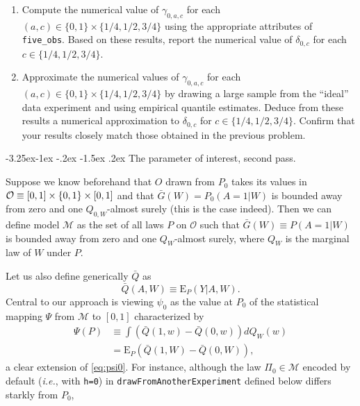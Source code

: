 \documentclass[]{article}
\makeatletter
\renewcommand\subsection{\@startsection{subsection}{3}{\z@}%
                                     {-3.25ex\@plus -1ex \@minus -.2ex}%
                                     {-1.5ex \@plus .2ex}%
                                     {\normalfont\normalsize\bfseries}}
\newcommand{\calM}{\mathcal{M}}
\newcommand{\calO}{\mathcal{O}}
\newcommand{\Exp}{\textrm{E}}
\newcommand{\Gbar}{\bar{G}}
\newcommand{\Qbar}{\bar{Q}}
\theoremstyle{definition}
\theoremstyle{definition}
\theoremstyle{definition}
\theoremstyle{remark}
\makeatother
\begin{document}
\begin{enumerate}
\def\labelenumi{\arabic{enumi}.}
\item
  \textdbend Compute the numerical value of \(\gamma_{0,a,c}\) for each
  \((a,c) \in \{0,1\} \times \{1/4, 1/2, 3/4\}\) using the appropriate
  attributes of \texttt{five\_obs}. Based on these results, report the
  numerical value of \(\delta_{0,c}\) for each
  \(c \in \{1/4, 1/2, 3/4\}\).
\item
  Approximate the numerical values of \(\gamma_{0,a,c}\) for each
  \((a,c) \in \{0,1\} \times \{1/4, 1/2, 3/4\}\) by drawing a large
  sample from the ``ideal'' data experiment and using empirical quantile
  estimates. Deduce from these results a numerical approximation to
  \(\delta_{0,c}\) for \(c \in \{1/4, 1/2, 3/4\}\). Confirm that your
  results closely match those obtained in the previous problem.
\end{enumerate}

\subsection{The parameter of interest, second pass.}
\label{subsec:parameter:second}

Suppose we know beforehand that \(O\) drawn from \(P_{0}\) takes its
values in \(\calO \equiv [0,1] \times \{0,1\} \times \interval{0}{1}\)
and that \(\Gbar(W) = P_{0}(A=1|W)\) is bounded away from zero and one
\(Q_{0,W}\)-almost surely (this is the case indeed). Then we can define
model \(\calM\) as the set of all laws \(P\) on \(\calO\) such that
\(\Gbar(W) \equiv P(A=1|W)\) is bounded away from zero and one
\(Q_{W}\)-almost surely, where \(Q_{W}\) is the marginal law of \(W\)
under \(P\).

Let us also define generically \(\Qbar\) as
\begin{equation*} \Qbar (A,W) \equiv
\Exp_{P}  (Y|A,  W).   \end{equation*} Central to our approach is
viewing \(\psi_{0}\) as the value at \(P_{0}\) of the statistical
mapping \(\Psi\) from \(\calM\) to \([0,1]\) characterized by
\begin{align*}  \Psi(P)  &\equiv  \int
\left(\Qbar(1, w) - \Qbar(0, w)\right) dQ_{W}(w) \\ &= \Exp_{P} \left(\Qbar(1,
W) -  \Qbar(0, W)\right), \end{align*} a clear extension of
\eqref{eq:psi0}. For instance, although the law \(\Pi_{0} \in \calM\)
encoded by default (\textit{i.e.}, with \texttt{h=0}) in
\texttt{drawFromAnotherExperiment} defined below differs starkly from
\(P_{0}\),
\end{document}
